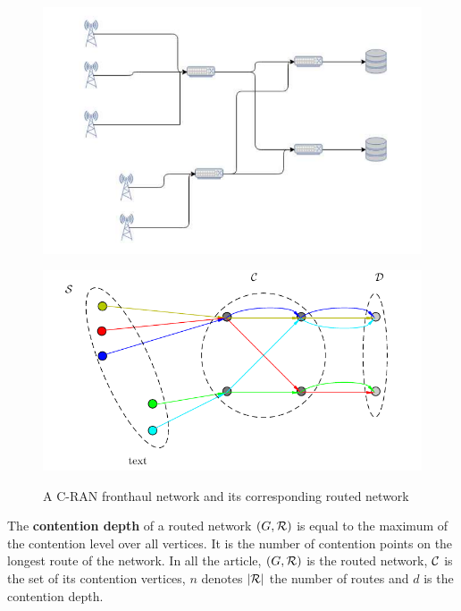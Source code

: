 \documentclass[english]{article}
\begin{document}
\begin{figure}

\begin{minipage}[c]{.45\linewidth}
	
	
	\includegraphics[scale=0.5]{fronthaul}



	 \end{minipage} 
 \hfill
 \begin{minipage}[c]{.45\linewidth}
	
	
	\includegraphics[scale=0.5]{graphmodel}\\

	 \end{minipage}
	 
\caption{A C-RAN fronthaul network and its corresponding routed network}
\label{fig:fronthaul}
\end{figure} 
	The  \textbf{contention depth} of a routed network $(G,{\cal R})$ is equal to the maximum of the contention level over all vertices. It is the number of contention points on the longest route of the network. In all the article, $(G,{\cal R})$ is the routed network, ${\cal C}$ is the set of its contention vertices, $n$ denotes $|\cal{R}|$ the number of routes and $d$ is the contention depth.  
\end{document}
